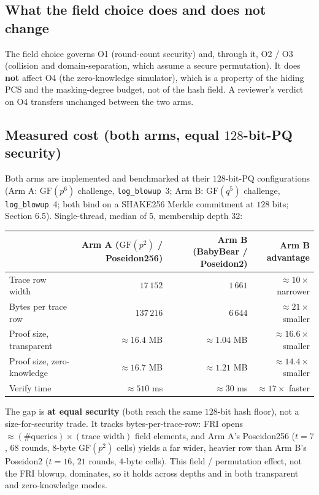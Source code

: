 \documentclass[11pt]{article}
\newcommand{\GF}[1]{\mathrm{GF}(#1)}
\theoremstyle{plain}
\theoremstyle{definition}
\begin{document}
\subsection{What the field choice does and does not change}

The field choice governs O1 (round-count security) and, through it, O2 / O3 (collision and
domain-separation, which assume a secure permutation). It does \textbf{not} affect O4 (the
zero-knowledge simulator), which is a property of the hiding PCS and the masking-degree budget, not
of the hash field. A reviewer's verdict on O4 transfers unchanged between the two arms.

\subsection{Measured cost (both arms, equal \texorpdfstring{$128$}{128}-bit-PQ security)}

Both arms are implemented and benchmarked at their $128$-bit-PQ configurations (Arm A: $\GF{p^6}$
challenge, \texttt{log\_blowup}~3; Arm B: $\GF{q^5}$ challenge, \texttt{log\_blowup}~4; both bind on a
SHAKE256 Merkle commitment at $128$ bits; Section 6.5). Single-thread, median of 5, membership depth
32:

\begin{table}[h]
\centering\footnotesize
\begin{tabular}{@{}lrrr@{}}
\toprule
 & Arm A ($\GF{p^2}$ / Poseidon256) & Arm B (BabyBear / Poseidon2) & Arm B advantage \\
\midrule
Trace row width          & $17\,152$         & $1\,661$         & $\approx 10\times$ narrower \\
Bytes per trace row       & $137\,216$        & $6\,644$         & $\approx 21\times$ smaller  \\
Proof size, transparent   & $\approx 16.4$ MB & $\approx 1.04$ MB & $\approx 16.6\times$ smaller \\
Proof size, zero-knowledge & $\approx 16.7$ MB & $\approx 1.21$ MB & $\approx 14.4\times$ smaller \\
Verify time               & $\approx 510$ ms  & $\approx 30$ ms   & $\approx 17\times$ faster    \\
\bottomrule
\end{tabular}
\end{table}

The gap is \textbf{at equal security} (both reach the same $128$-bit hash floor), not a
size-for-security trade. It tracks bytes-per-trace-row: FRI opens $\approx (\#\mathrm{queries}) \times
(\text{trace width})$ field elements, and Arm A's Poseidon256 ($t = 7$, $68$ rounds, $8$-byte
$\GF{p^2}$ cells) yields a far wider, heavier row than Arm B's Poseidon2 ($t = 16$, $21$ rounds,
$4$-byte cells). This field / permutation effect, not the FRI blowup, dominates, so it holds across
depths and in both transparent and zero-knowledge modes.
\end{document}
